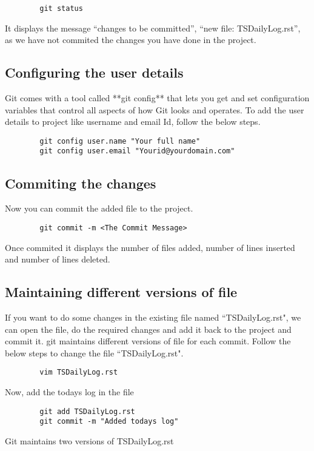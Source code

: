 \documentclass{book}
\begin{document}
    \begin{verbatim}
        git status
    \end{verbatim}

    It displays the message “changes to be committed”, “new file: TSDailyLog.rst”, as we have not commited the changes you have done in the project.
    \subsection*{Configuring the user details}

    Git comes with a tool called **git config** that lets you get and set configuration variables that control all aspects of how Git looks and operates. To add the user details to project like username and email Id, follow the below steps.

    \begin{verbatim}
        git config user.name "Your full name"
        git config user.email "Yourid@yourdomain.com"
    \end{verbatim}

    \subsection*{Commiting the changes}
    Now you can commit the added file to the project.
    \begin{verbatim}
        git commit -m <The Commit Message>
    \end{verbatim}
    Once commited it displays the number of files added, number of lines inserted and number of lines deleted.
    \subsection*{Maintaining different versions of file}
    If you want to do some changes in the existing file named ``TSDailyLog.rst", we can open the file, do the required changes and add it back to the project and commit it. git maintains different versions of file for each commit. Follow the below steps to change the file ``TSDailyLog.rst".
    \begin{verbatim}
        vim TSDailyLog.rst
    \end{verbatim}
    Now, add the todays log in the file

    \begin{verbatim}
        git add TSDailyLog.rst
        git commit -m "Added todays log"
    \end{verbatim}
    Git maintains two versions of TSDailyLog.rst
\end{document}
